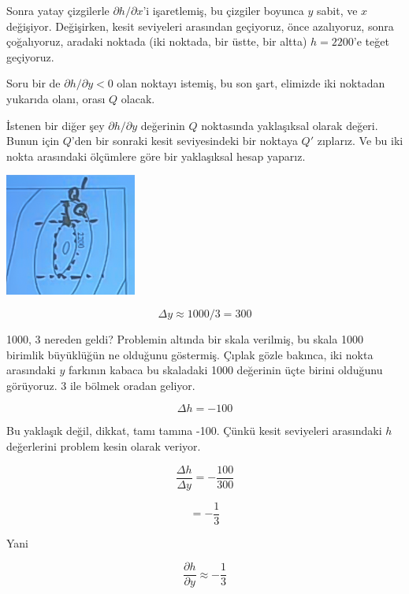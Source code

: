 \documentclass[12pt,fleqn]{article}\usepackage{../../common}
\begin{document}
Sonra yatay çizgilerle $\partial h/\partial x$'i işaretlemiş, bu çizgiler
boyunca $y$ sabit, ve $x$ değişiyor. Değişirken, kesit seviyeleri arasından
geçiyoruz, önce azalıyoruz, sonra çoğalıyoruz, aradaki noktada (iki
noktada, bir üstte, bir altta) $h=2200$'e teğet geçiyoruz. 

Soru bir de  $\partial h/\partial y < 0$ olan noktayı istemiş, bu son şart,
elimizde iki noktadan yukarıda olanı, orası $Q$ olacak. 

İstenen bir diğer şey $\partial h/\partial y$ değerinin $Q$ noktasında
yaklaşıksal olarak değeri. Bunun için $Q$'den bir sonraki kesit
seviyesindeki bir noktaya $Q'$ zıplarız. Ve bu iki nokta arasındaki
ölçümlere göre bir yaklaşıksal hesap yaparız. 

\begin{center}
\includegraphics[height=4cm]{15_4.png}
\end{center}

$$ \Delta y \approx 1000 / 3 = 300 $$

1000, 3 nereden geldi? Problemin altında bir skala verilmiş, bu skala 1000
birimlik büyüklüğün ne olduğunu göstermiş. Çıplak gözle bakınca, iki nokta
arasındaki $y$ farkının kabaca bu skaladaki 1000 değerinin üçte birini
olduğunu görüyoruz. 3 ile bölmek oradan geliyor. 

$$ \Delta h = -100 $$

Bu yaklaşık değil, dikkat, tamı tamına -100. Çünkü kesit seviyeleri
arasındaki $h$ değerlerini problem kesin olarak veriyor.

$$ 
\frac{\Delta h}{\Delta y} = -\frac{100}{300}
 $$

$$ = -\frac{1}{3} $$

Yani 

$$ 
\frac{\partial h}{\partial y} \approx -\frac{1}{3}
 $$
\end{document}
